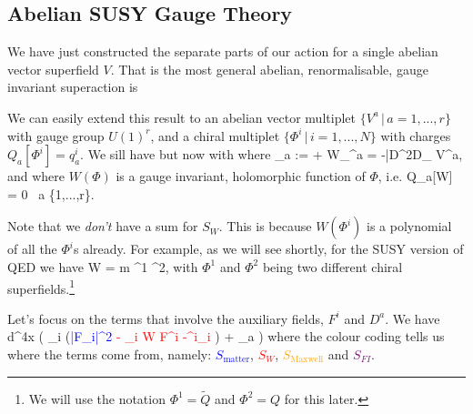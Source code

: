 \subsection{Abelian SUSY Gauge Theory}

We have just constructed the separate parts of our action for a single abelian vector superfield $V$. That is the most general abelian, renormalisable, gauge invariant superaction is 

We can easily extend this result to an abelian vector multiplet $\{V^a \, | \, a=1,...,r\}$ with gauge group $U(1)^r$, and a chiral multiplet $\{\Phi^i\, | \, i=1,...,N\}$ with charges $Q_a[\Phi^i]=q_a^i$.  We sill have  but now with 
\noindent where 
\bse 
    \tau_a :=  +  \qand W_{\a}^a = -\bar{D}^2D_{\a} V^a,
\ese
and where $W(\Phi)$ is a gauge invariant, holomorphic function of $\Phi$, i.e. 
\bse 
    Q_a[W] = 0 \qquad \forall \,  a \in \{1,...,r\}.
\ese 

\br 
    Note that we \textit{don't} have a sum for $S_W$. This is because $W(\Phi^i)$ is a polynomial of all the $\Phi^i$s already. For example, as we will see shortly, for the SUSY version of QED we have 
    \bse 
        W = m \Phi^1 \Phi^2,
    \ese 
    with $\Phi^1$ and $\Phi^2$ being two different chiral superfields.\footnote{We will use the notation $\Phi^1=\widetilde{Q}$ and $\Phi^2 = Q$ for this later.}
\er 

Let's focus on the terms that involve the auxiliary fields, $F^i$ and $D^a$. We have 
\bse 
    \int d^4x \Bigg( \sum_i \big(\textcolor{blue}{|F_i|^2} \textcolor{red}{- \p_i W F^i -\Bar{\p}^i_i} \big) + \sum_a \bigg[ \textcolor{orange}{\frac{1}{2g_a^2}(D^a)^2} - \textcolor{purple}{\xi_aD^a} + \textcolor{orange}{\sum_{i=1}^N q_a^i |\phi^i|^2 D^a}  \bigg] \Bigg)
\ese 
where the colour coding tells us where the terms come from, namely: \textcolor{blue}{$S_{\text{matter}}$}, \textcolor{red}{$S_W$}, \textcolor{orange}{$S_{\text{Maxwell}}$} and \textcolor{purple}{$S_{FI}$}. 

